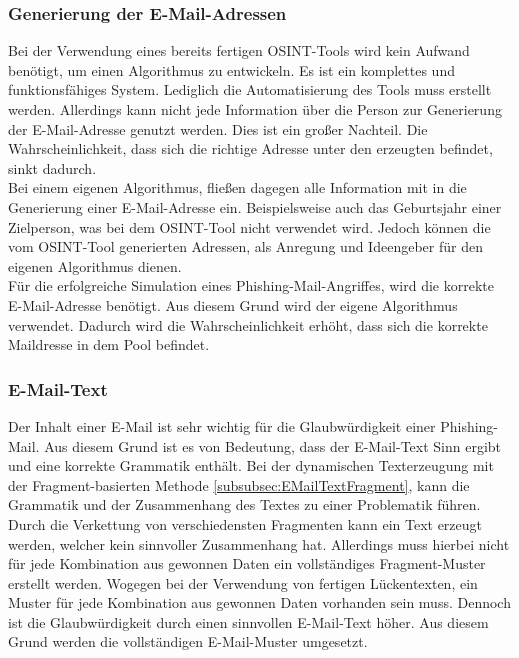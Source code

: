 	\subsubsection{Generierung der E-Mail-Adressen}
	Bei der Verwendung eines bereits fertigen OSINT-Tools wird kein Aufwand benötigt, um einen Algorithmus zu entwickeln. Es ist ein komplettes und funktionsfähiges System. Lediglich die Automatisierung des Tools muss erstellt werden. Allerdings kann nicht jede Information über die Person zur Generierung der E-Mail-Adresse genutzt werden. Dies ist ein großer Nachteil. Die Wahrscheinlichkeit, dass sich die richtige Adresse unter den erzeugten befindet, sinkt dadurch.\\
	Bei einem eigenen Algorithmus, fließen dagegen alle Information mit in die Generierung einer E-Mail-Adresse ein. Beispielsweise auch das Geburtsjahr einer Zielperson, was bei dem OSINT-Tool \cite{EmailAssumptions} nicht verwendet wird. Jedoch können die vom OSINT-Tool generierten Adressen, als Anregung und Ideengeber für den eigenen Algorithmus dienen.\\
	Für die erfolgreiche Simulation eines Phishing-Mail-Angriffes, wird die korrekte E-Mail-Adresse benötigt. Aus diesem Grund wird der eigene Algorithmus verwendet. Dadurch wird die Wahrscheinlichkeit erhöht, dass sich die korrekte Maildresse in dem Pool befindet.
	
	\subsubsection{E-Mail-Text}
	Der Inhalt einer E-Mail ist sehr wichtig für die Glaubwürdigkeit einer Phishing-Mail. Aus diesem Grund ist es von Bedeutung, dass der E-Mail-Text Sinn ergibt und eine korrekte Grammatik enthält. Bei der dynamischen Texterzeugung mit der Fragment-basierten Methode \ref{subsubsec:EMailTextFragment}, kann die Grammatik und der Zusammenhang des Textes zu einer Problematik führen. Durch die Verkettung von verschiedensten Fragmenten kann ein Text erzeugt werden, welcher kein sinnvoller Zusammenhang hat. Allerdings muss hierbei nicht für jede Kombination aus gewonnen Daten ein vollständiges Fragment-Muster erstellt werden. Wogegen bei der Verwendung von fertigen Lückentexten, ein Muster für jede Kombination aus gewonnen Daten vorhanden sein muss. Dennoch ist die Glaubwürdigkeit durch einen sinnvollen E-Mail-Text höher. Aus diesem Grund werden die vollständigen E-Mail-Muster umgesetzt.


	

